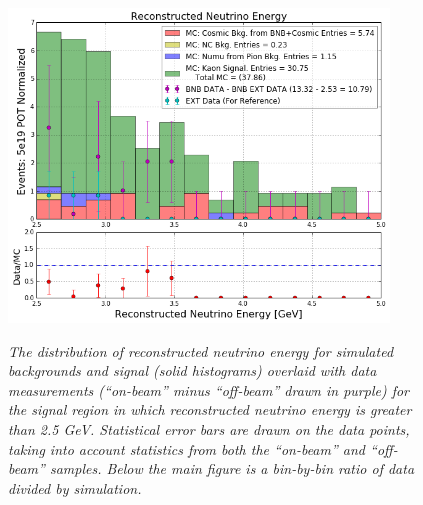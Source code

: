 \begin{figure}[ht!]
\centering
	\includegraphics[width=0.9\textwidth]{Figures/kaon_both_signal.png} \\
\caption{\textit{The distribution of reconstructed neutrino energy for simulated backgrounds and signal (solid histograms) overlaid with data measurements (``on-beam'' minus ``off-beam'' drawn in purple) for the signal region in which reconstructed neutrino energy is greater than 2.5 GeV. Statistical error bars are drawn on the data points, taking into account statistics from both the ``on-beam'' and ``off-beam'' samples. Below the main figure is a bin-by-bin ratio of data divided by simulation.}}\label{kaon_stack_signal_both}
\end{figure}

